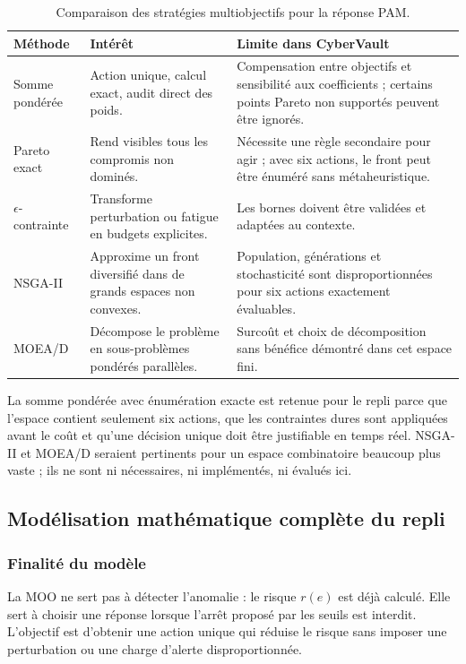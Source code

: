 \documentclass[11pt,a4paper,oneside]{report}
\theoremstyle{definition}
\theoremstyle{plain}
\begin{document}
\begin{table}[H]
\centering
\small
\caption{Comparaison des stratégies multiobjectifs pour la réponse PAM.}
\label{tab:ai-ro-moo-alternatives}
\begin{tabularx}{\textwidth}{@{}p{2.5cm}X X@{}}
\toprule
\textbf{Méthode} & \textbf{Intérêt} & \textbf{Limite dans CyberVault}\\
\midrule
Somme pondérée & Action unique, calcul exact, audit direct des poids. &
Compensation entre objectifs et sensibilité aux coefficients ; certains
points Pareto non supportés peuvent être ignorés.\\
Pareto exact & Rend visibles tous les compromis non dominés. &
Nécessite une règle secondaire pour agir ; avec six actions, le front peut
être énuméré sans métaheuristique.\\
$\epsilon$-contrainte & Transforme perturbation ou fatigue en budgets
explicites. & Les bornes doivent être validées et adaptées au contexte.\\
NSGA-II & Approxime un front diversifié dans de grands espaces non convexes. &
Population, générations et stochasticité sont disproportionnées pour six
actions exactement évaluables.\\
MOEA/D & Décompose le problème en sous-problèmes pondérés parallèles. &
Surcoût et choix de décomposition sans bénéfice démontré dans cet espace
fini.\\
\bottomrule
\end{tabularx}
\end{table}

La somme pondérée avec énumération exacte est retenue pour le repli parce que
l'espace contient seulement six actions, que les contraintes dures sont
appliquées avant le coût et qu'une décision unique doit être justifiable en
temps réel. NSGA-II et MOEA/D seraient pertinents pour un espace combinatoire
beaucoup plus vaste ; ils ne sont ni nécessaires, ni implémentés, ni évalués
ici.

\subsection*{Modélisation mathématique complète du repli}

\subsubsection*{Finalité du modèle}

La MOO ne sert pas à détecter l'anomalie : le risque $r(e)$ est déjà calculé.
Elle sert à choisir une réponse lorsque l'arrêt proposé par les seuils est
interdit. L'objectif est d'obtenir une action unique qui réduise le risque sans
imposer une perturbation ou une charge d'alerte disproportionnée.
\end{document}
